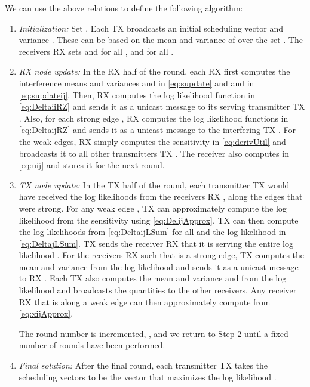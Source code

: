 \documentclass[letterpaper,twocolumn,twoside]{IEEEtran}
\begin{document}
We can use the above relations to define the following algorithm:
\begin{enumerate}
\item \emph{Initialization:}  Set .  Each TX 
broadcasts an initial scheduling vector  and variance
. These can be based on the mean and variance of
 over the set . The receivers RX  sets  and  for all
, and  for all .


\item \emph{RX node update:}  In the RX half of the round,
each RX  first computes the interference means and variances
 and  in \eqref{eq:supdate} and
 and  in \eqref{eq:supdateij}.
Then, RX  computes the log likelihood function  in \eqref{eq:DeltaiiRZ} and sends it as a unicast
message to its serving transmitter TX . Also, for each strong
edge , RX  computes the log likelihood functions
 in \eqref{eq:DeltaijRZ} and sends it as
a unicast message to the interfering TX .  For the weak edges, RX
 simply computes the sensitivity  in
\eqref{eq:derivUtil} and broadcasts it to all other transmitters TX
. The receiver also computes  in \eqref{eq:uij} and
stores it for the next round.

\item \emph{TX node update:}  In the TX half of the round, each transmitter TX
 would have received the log likelihoods  from the receivers RX , along the edges 
that were strong.  For any weak edge , TX  can
approximately compute the log likelihood from the sensitivity
 using \eqref{eq:DelijApprox}. TX  can then compute
the log likelihoods  from
\eqref{eq:DeltaijLSum} for all  and the log
likelihood  in \eqref{eq:DeltajLSum}. TX 
sends the receiver RX  that it is serving the entire log
likelihood . For the receivers RX 
such that  is a strong edge, TX  computes the mean
 and variance  from
the log likelihood  and sends it as a
unicast message to RX . Each TX  also computes the mean and
variance  and  from the log
likelihood  and broadcasts the quantities to
the other receivers.  Any receiver RX  that is along a weak edge
 can then approximately compute  from
\eqref{eq:xijApprox}.

The round number is incremented, , and we return to Step 2
until a fixed number of rounds have been performed.


\item \emph{Final solution:}  After the final round,
each transmitter TX  takes the scheduling vectors to be the
vector  that maximizes the log likelihood
.
\end{enumerate}
\end{document}
